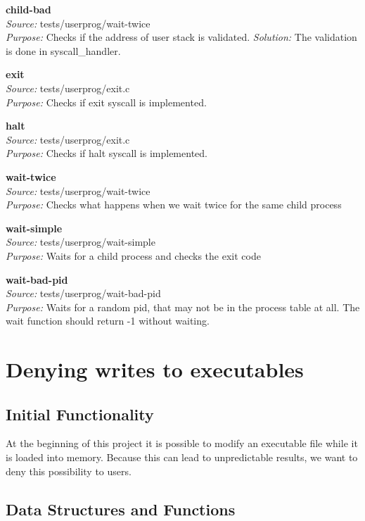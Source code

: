 {      \textbf{child-bad}\\
      \textit{Source:} tests/userprog/wait-twice\\
      \textit{Purpose:} Checks if the address of user stack is validated.
      \textit{Solution:} The validation is done in syscall\_handler.

      \textbf{exit}\\
      \textit{Source:} tests/userprog/exit.c\\
      \textit{Purpose:} Checks if exit syscall is implemented.

      \textbf{halt}\\
      \textit{Source:} tests/userprog/exit.c\\
      \textit{Purpose:} Checks if halt syscall is implemented.
      
      \textbf{wait-twice}\\
      \textit{Source:} tests/userprog/wait-twice\\
      \textit{Purpose:} Checks what happens when we wait twice for the same child process

      \textbf{wait-simple}\\
      \textit{Source:} tests/userprog/wait-simple\\
      \textit{Purpose:} Waits for a child process and checks the exit code

      \textbf{wait-bad-pid} \\
      \textit{Source:} tests/userprog/wait-bad-pid\\
      \textit{Purpose:} Waits for a random pid, that may not be in the process table at all. The wait function should return -1 without waiting.
    
\section{Denying writes to executables}

     \subsection{Initial Functionality}

	At the beginning of this project it is possible to modify an executable file while it is loaded into memory. Because this can lead to unpredictable results, we want to deny this possibility to users.

    \subsection{Data Structures and Functions}

}
